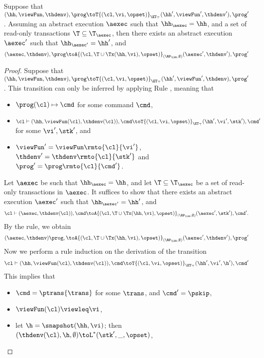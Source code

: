 \begin{proposition}
\label{prop:kv2aexec_transition}
Suppose that $(\hh, \viewFun, \thdenv), \prog \toT{(\cl, \vi, \opset)}_{\ET_{\top}} (\hh', 
\viewFun', \thdenv'), \prog'$. Assuming an abstract execution $\aexec$ 
such that $\hh_{\aexec} = \hh$, and a set of read-only transactions $\T \subseteq \T_{\aexec}$,
then there exists an abstract execution $\aexec'$ such that $\hh_{\aexec'} = \hh'$, and 
\[
(\aexec, \thdenv), \prog \toA{(\cl, \T \cup \Tx(\hh, \vi), \opset)}_{(\RP_{\LWW}, \emptyset)}
(\aexec', \thdenv'), \prog'
\]
\end{proposition}
\begin{proof}
Suppose that $(\hh, \viewFun, \thdenv), \prog \toT{(\cl, \vi, \opset)}_{\ET_{\top}} (\hh', \viewFun', \thdenv), \prog'$. 
This transition can only be inferred by applying Rule , meaning that 
\begin{itemize}
\item $\prog(\cl) \mapsto \cmd$ for some command $\cmd$, 
\item $\cl \vdash (\hh, \viewFun(\cl), \thdenv(\cl)), \cmd \toT{(\cl, \vi, \opset)}_{\ET_{\top}} (\hh', \vi', \stk'), \cmd'$ 
for some $\vi', \stk'$, and 
\item $\viewFun' = \viewFun\rmto{\cl}{\vi'}$, $\thdenv' = \thdenv\rmto{\cl}{\stk'}$ and $\prog' = \prog\rmto{\cl}{\cmd'}$. 
\end{itemize}
Let $\aexec$ be such that $\hh_{\aexec} = \hh$, and let $\T \subseteq \T_{\aexec}$ be a set of read-only transactions in $\aexec$. 
It suffices to show that there exists an abstract execution $\aexec'$ such that 
$\hh_{\aexec'} = \hh'$, and 
\[
    \cl \vdash (\aexec, \thdenv(\cl)), \cmd \toA{(\cl, \T \cup \Tx(\hh, \vi), \opset)}_{(\RP_{\LWW}, \emptyset)} (\aexec', \stk'), \cmd'.
\]
By the  rule, we obtain 
\[ 
    (\aexec, \thdenv) \prog, \toA{(\cl, \T \cup \Tx(\hh,\vi), \opset)}_{(\RP_{\LWW}, \emptyset)} (\aexec' ,\thdenv'), \prog'
\]
Now we perform a rule induction on the derivation of the transition 
\[
    \cl \vdash (\hh, \viewFun(\cl), \thdenv(\cl)), \cmd \toT{(\cl, \vi, \opset)}_{\ET_{\top}} (\hh', \vi', \h'), \cmd'
\]
This implies that 
\begin{itemize}
\item $\cmd = \ptrans{\trans}$ for some $\trans$, and $\cmd' = \pskip$,
\item $\viewFun(\cl) \viewleq \vi$, 
\item let $\h = \snapshot(\hh, \vi)$; then $(\thdenv(\cl), \h, \emptyset) \toL^{\ast} (\stk', \_, \opset)$, 

\end{itemize}
\end{proof}
